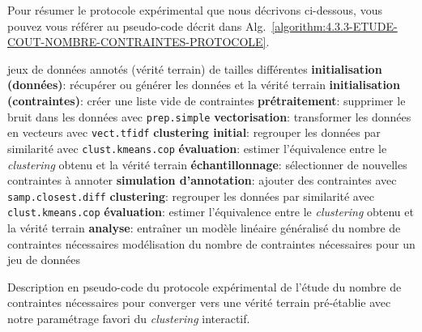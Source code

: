			Pour résumer le protocole expérimental que nous décrivons ci-dessous, vous pouvez vous référer au pseudo-code décrit dans Alg.~\ref{algorithm:4.3.3-ETUDE-COUT-NOMBRE-CONTRAINTES-PROTOCOLE}.
			\begin{algorithm}[!htb]
				\begin{algorithmic}[1]
					\Require jeux de données annotés (vérité terrain) de tailles différentes
						\State \textbf{initialisation (données)}: récupérer ou générer les données et la vérité terrain
						\State \textbf{initialisation (contraintes)}: créer une liste vide de contraintes
						\State \textbf{prétraitement}: supprimer le bruit dans les données avec \texttt{prep.simple}
						\State \textbf{vectorisation}: transformer les données en vecteurs avec \texttt{vect.tfidf}
						\State \textbf{clustering initial}: regrouper les données par similarité avec \texttt{clust.kmeans.cop}
						\State \textbf{évaluation}: estimer l'équivalence entre le \textit{clustering} obtenu et la vérité terrain
						\Repeat
							\State \textbf{échantillonnage}: sélectionner de nouvelles contraintes à annoter
							\State \textbf{simulation d'annotation}: ajouter des contraintes avec \texttt{samp.closest.diff}
							\State \textbf{clustering}: regrouper les données par similarité avec \texttt{clust.kmeans.cop}
							\State \textbf{évaluation}: estimer l'équivalence entre le \textit{clustering} obtenu et la vérité terrain
					\EndFor						
					\State \textbf{analyse}: entraîner un modèle linéaire généralisé du nombre de contraintes nécessaires
					\Ensure modélisation du nombre de contraintes nécessaires pour un jeu de données
				\end{algorithmic}
				\caption{Description en pseudo-code du protocole expérimental de l'étude du nombre de contraintes nécessaires pour converger vers une vérité terrain pré-établie avec notre paramétrage favori du \textit{clustering} interactif.}
				\label{algorithm:4.3.3-ETUDE-COUT-NOMBRE-CONTRAINTES-PROTOCOLE}
			\end{algorithm}
			
